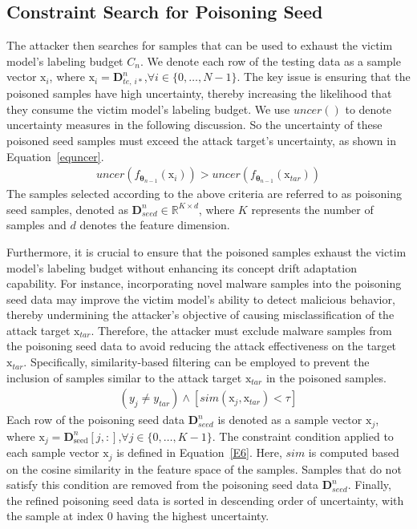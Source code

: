 \documentclass[lettersize,journal]{IEEEtran}
\begin{document}
\subsection{Constraint Search for Poisoning Seed}
The attacker then searches for samples that can be used to exhaust the victim model’s labeling budget $C_{n}$.
We denote each row of the testing data as a sample vector $\bm{\mathrm{x}}_{i}$, where $\bm{\mathrm{x}}_{i} = \bm{D}_{te,\,i*}^{n}$,$\forall i \in \{0, \dots, N-1\}$.
The key issue is ensuring that the poisoned samples have high uncertainty, thereby increasing the likelihood that they consume the victim model's labeling budget.
We use $uncer()$ to denote uncertainty measures in the following discussion.
So the uncertainty of these poisoned seed samples must exceed the attack target’s uncertainty, as shown in Equation~\ref{equncer}.
\begin{equation}
	\begin{aligned}
		uncer(f_{\bm{\theta}_{n-1}} \left( \bm{\mathrm{x}}_{i} \right)) > uncer(f_{\bm{\theta}_{n-1}} \left( \bm{\mathrm{x}}_{tar} \right))
	\end{aligned}
	\label{equncer}
\end{equation}
The samples selected according to the above criteria are referred to as poisoning seed samples, denoted as $\bm{D}_{seed}^{n} \in \mathbb{R}^{K \times d}$, where $K$ represents the number of samples and $d$ denotes the feature dimension.

Furthermore, it is crucial to ensure that the poisoned samples exhaust the victim model’s labeling budget without enhancing its concept drift adaptation capability.
For instance, incorporating novel malware samples into the poisoning seed data may improve the victim model’s ability to detect malicious behavior, thereby undermining the attacker’s objective of causing misclassification of the attack target $\bm{\mathrm{x}}_{tar}$.
Therefore, the attacker must exclude malware samples from the poisoning seed data to avoid reducing the attack effectiveness on the target $\bm{\mathrm{x}}_{tar}$.
Specifically, similarity-based filtering can be employed to prevent the inclusion of samples similar to the attack target $\bm{\mathrm{x}}_{tar}$ in the poisoned samples.
\begin{equation}
	\begin{aligned}
		(y_{j} \neq y_{tar}) \land [sim(\bm{\mathrm{x}}_{j},\bm{\mathrm{x}}_{tar})< \tau]
	\end{aligned}
	\label{E6}
\end{equation}
Each row of the poisoning seed data $\bm{D}_{seed}^{n}$ is denoted as a sample vector $\bm{\mathrm{x}}_{j}$, where $\bm{\mathrm{x}}_{j} = \bm{D}_{\text{seed}}^{n}[j,:]$,$\forall j \in \{0, \dots, K-1\}$.
The constraint condition applied to each sample vector $\bm{\mathrm{x}}_{j}$ is defined in Equation~\ref{E6}.
Here, $sim$ is computed based on the cosine similarity in the feature space of the samples.
Samples that do not satisfy this condition are removed from the poisoning seed data $\bm{D}_{seed}^{n}$.
Finally, the refined poisoning seed data is sorted in descending order of uncertainty, with the sample at index 0 having the highest uncertainty.
\end{document}
